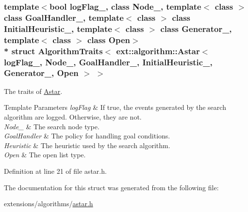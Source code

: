 \subsubsection*{template$<$bool log\+Flag\+\_\+, class Node\+\_\+, template$<$ class $>$ class Goal\+Handler\+\_\+, template$<$ class $>$ class Initial\+Heuristic\+\_\+, template$<$ class $>$ class Generator\+\_\+, template$<$ class $>$ class Open$>$\\*
struct Algorithm\+Traits$<$ ext\+::algorithm\+::\+Astar$<$ log\+Flag\+\_\+, Node\+\_\+, Goal\+Handler\+\_\+, Initial\+Heuristic\+\_\+, Generator\+\_\+, Open $>$ $>$}

The traits of \hyperlink{structAstar}{Astar}. 


\begin{DoxyTemplParams}{Template Parameters}
{\em log\+Flag} & If {\ttfamily true}, the events generated by the search algorithm are logged. Otherwise, they are not. \\
\hline
{\em Node\+\_\+} & The search node type. \\
\hline
{\em Goal\+Handler} & The policy for handling goal conditions. \\
\hline
{\em Heuristic} & The heuristic used by the search algorithm. \\
\hline
{\em Open} & The open list type. \\
\hline
\end{DoxyTemplParams}


Definition at line 21 of file astar.\+h.



The documentation for this struct was generated from the following file\+:\begin{DoxyCompactItemize}
\item 
extensions/algorithms/\hyperlink{astar_8h}{astar.\+h}\end{DoxyCompactItemize}
